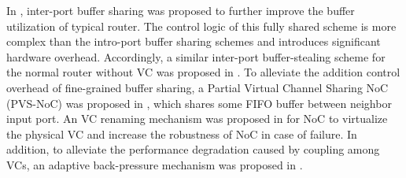 \documentclass[10pt,conference]{IEEEtran}
\begin{document}
In \cite{Neishaburi:2009:RAN:1531542.1531658}\cite{5770788}, inter-port buffer sharing was proposed to further improve the buffer utilization of typical router. The control logic of this fully shared scheme is more complex than the intro-port buffer sharing schemes and introduces significant hardware overhead. Accordingly, a similar inter-port buffer-stealing scheme for the normal router without VC was proposed in \cite{5722177}. To alleviate the addition control overhead of fine-grained buffer sharing, a Partial Virtual Channel Sharing NoC (PVS-NoC) was proposed in \cite{5739053}, which shares some FIFO buffer between neighbor input port. An VC renaming mechanism was proposed in \cite{6296442} for NoC to virtualize the physical VC and increase the robustness of NoC in case of failure. In addition, to alleviate the performance degradation caused by coupling among VCs, an adaptive back-pressure mechanism was proposed in \cite{BeckerJMD12}.

\end{document}
